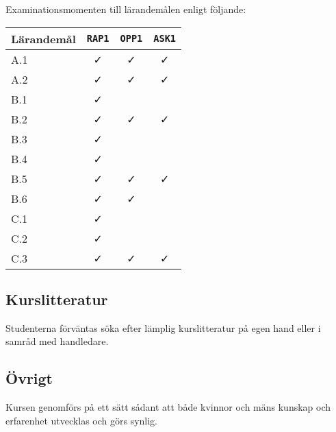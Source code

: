 Examinationsmomenten till lärandemålen enligt följande:

\begin{longtable}[]{@{}lccc@{}}
\toprule
\textsf{Lärandemål} & \texttt{RAP1} & \texttt{OPP1} & \texttt{ASK1}\tabularnewline
\midrule
\endhead
A.1 & \faCheck & \faCheck & \faCheck\tabularnewline
A.2 & \faCheck & \faCheck & \faCheck\tabularnewline
B.1 & \faCheck & &\tabularnewline
B.2 & \faCheck & \faCheck & \faCheck\tabularnewline
B.3 & \faCheck & &\tabularnewline
B.4 & \faCheck & &\tabularnewline
B.5 & \faCheck & \faCheck & \faCheck\tabularnewline
B.6 & \faCheck & \faCheck &\tabularnewline
C.1 & \faCheck & &\tabularnewline
C.2 & \faCheck & &\tabularnewline
C.3 & \faCheck & \faCheck & \faCheck\tabularnewline
\bottomrule
\end{longtable}

\subsection*{Kurslitteratur}

Studenterna förväntas söka efter lämplig kurslitteratur på egen hand
eller i samråd med handledare.

\subsection*{Övrigt}

Kursen genomförs på ett sätt sådant att både kvinnor och mäns kunskap och erfarenhet utvecklas och görs synlig.
